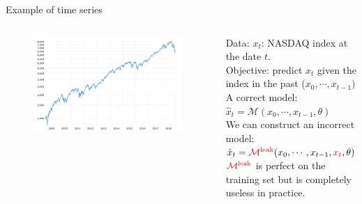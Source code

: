 \documentclass[handout]{beamer}
\begin{document}
\begin{frame}{Example of time series}
\begin{columns}

    \begin{figure}
    \includegraphics[width=\textwidth]{fig/L1/nasdaq-composite-index-10-year-daily-chart-2019-01-09-macrotrends.png}
    \end{figure}
\alert{Data:} $x_t$: NASDAQ index at the date $t$.\\
\alert{Objective:} predict $x_t$ given the index in the past ($x_0, \cdots , x_{t-1})$\\
\alert{A correct model:} $\hat{x}_t = \mathcal{M}(x_0, \cdots , x_{t-1},\theta)$\\
We can construct an incorrect model: $\hat{x}_t = \textcolor{red}{\mathcal{M^{\rm leak}}}(x_0, \cdots , x_{t-1},\textcolor{red}{x_t},\theta)$\\
$\textcolor{red}{\mathcal{M^{\rm leak}}}$ is perfect on the training set but is completely useless in practice.


\end{columns}

\end{frame}
\end{document}
